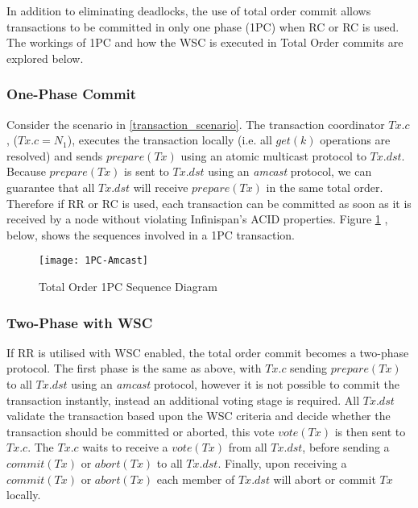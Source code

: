 	    In addition to eliminating deadlocks,  the use of total order commit allows transactions to be committed in only one phase (1PC) when RC or RC is used.  The workings of 1PC and how the WSC is executed in Total Order commits are explored below.  
	    
	        \subsubsection*{One-Phase Commit}
	        Consider the scenario in \ref{transaction_scenario}.  The transaction coordinator $Tx.c$, ($Tx.c = N_1$), executes the transaction locally (i.e. all $get(k)$ operations are resolved) and sends $prepare(Tx)$ using an atomic multicast protocol to $Tx.dst$.  Because $prepare(Tx)$ is sent to $Tx.dst$ using an \emph{amcast} protocol, we can guarantee that all $Tx.dst$ will receive $prepare(Tx)$ in the same total order.  Therefore if RR or RC is used, each transaction can be committed as soon as it is received by a node without violating Infinispan's ACID properties.  Figure \ref{fig:total_order_1PC} , below, shows the sequences involved in a 1PC transaction.  
	        
            \begin{figure}[htbp!] 
                \centering    
                \texttt{[image: 1PC-Amcast]}
                \caption[Total Order One-phase Commit Protocol]{Total Order 1PC Sequence Diagram}
                \label{fig:total_order_1PC}
            \end{figure}	        
	        
		        
			\subsubsection*{Two-Phase with WSC}      
	        If RR is utilised with WSC enabled, the total order commit becomes a two-phase protocol.  The first phase is the same as above, with $Tx.c$ sending $prepare(Tx)$ to all $Tx.dst$ using an \emph{amcast} protocol, however it is not possible to commit the transaction instantly, instead an additional voting stage is required.  All $Tx.dst$ validate the transaction based upon the WSC criteria and decide whether the transaction should be committed or aborted, this vote $vote(Tx)$ is then sent to $Tx.c$.  The $Tx.c$ waits to receive a $vote(Tx)$ from all $Tx.dst$, before sending a $commit(Tx)$ or $abort(Tx)$ to all $Tx.dst$.  Finally, upon receiving a $commit(Tx)$ or $abort(Tx)$ each member of $Tx.dst$ will abort or commit $Tx$ locally.          
	        
